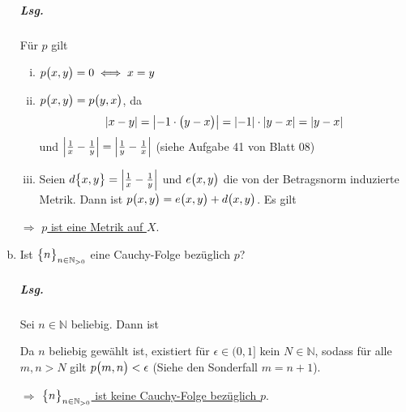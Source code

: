 \documentclass{scrreprt}
\begin{document}
\begin{enumerate}[(a)]
  \subparagraph{Lsg.} Für $p$ gilt
  \begin{enumerate}[(i)]
  \item $p\qty\big(x, y) = 0 \iff x = y$
  \item $p\qty\big(x, y) = p\qty\big(y, x)$, da
    \[
      \abs{x - y} = \abs{-1 \cdot \qty\big(y - x)} =
      \abs{-1} \cdot \abs{y - x} = \abs{y - x}
    \]
    und $\abs{\frac{1}{x} - \frac{1}{y}} = \abs{\frac{1}{y} - \frac{1}{x}}$
    (siehe Aufgabe 41 von Blatt 08)
  \item Seien $d\qty\big{x, y} = \abs{\frac{1}{x} - \frac{1}{y}}$ und
    $e\qty\big(x, y)$ die von der Betragsnorm induzierte Metrik.
    Dann ist $p\qty\big(x, y) = e\qty\big(x, y) + d\qty\big(x, y)$.
    Es gilt
  \end{enumerate}

  $\Rightarrow$ \underline{$p$ ist eine Metrik auf $X$}.

\item Ist $\qty\big{n}_{n \in \mathbb{N}_{> 0}}$ eine Cauchy-Folge bezüglich $p$?

  \subparagraph{Lsg.} Sei $n \in \mathbb{N}$ beliebig.
  Dann ist

  Da $n$ beliebig gewählt ist, existiert für $\epsilon \in \big(0, 1\big]$ kein
  $N \in \mathbb{N}$, sodass für alle $m, n > N$ gilt
  $p\qty\big(m, n) < \epsilon$ (Siehe den Sonderfall $m = n + 1$).

  $\Rightarrow$ \underline{$\qty\big{n}_{n \in \mathbb{N}_{> 0}}$ ist keine
    Cauchy-Folge bezüglich $p$}.


\end{enumerate}
\end{document}
